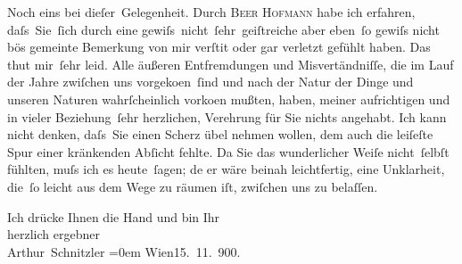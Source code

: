 \pstart
           Noch eins bei dieſer Gelegenheit. Durch \textsc{Beer Hofmann} habe ich erfahren, daſs Sie ſich \label{K_L03937-1v}\label{K_L03937-1} durch eine gewiſs nicht ſehr geiſtreiche aber
               eben ſo gewiſs nicht bös gemeinte Bemerkung von mir verſti{\geminationm}t oder gar verletzt
               gefühlt haben. Das thut mir ſehr leid. Alle äußeren Entfremdungen {\pb}und Misvertändniſſe, die im Lauf der Jahre zwiſchen uns
               vorgeko{\geminationm}en ſind und nach der Natur der Dinge und unseren Naturen wahrſcheinlich
               vorko{\geminationm}en mußten, haben, meiner aufrichtigen und in vieler Beziehung ſehr herzlichen,
               Verehrung für Sie nichts angehabt. Ich kann nicht denken, daſs Sie einen Scherz übel
               nehmen wollen, dem auch die leiſeſte Spur einer kränkenden Abſicht fehlte. Da Sie {\pb}das wunderlicher Weiſe nicht ſelbſt fühlten, muſs ich es
               heute ſagen; de{\geminationn} er wäre beinah leichtfertig, eine Unklarheit, die ſo leicht aus dem
               Wege zu räumen iſt, zwiſchen uns zu belaſſen.\pend
           
\pstart
           Ich drücke Ihnen die Hand und bin Ihr{\\[\baselineskip]}herzlich ergebner{\\[\baselineskip]}\spacefill\mbox{Arthur Schnitzler}\pend
           \leftskip=0em{}
\pstart
           Wien15. 11. 900.\pend
           \endnumbering{}
\begin{anhang}
\end{anhang}\newcommand{\dateiname}{L03937}\newcommand{\titel}{Arthur Schnitzler an Theodor Herzl, 15. 11. 1900}\newcommand{\editorInnen}{Herausgegeben von Jahnke, SelmaMüller, Martin Anton}
